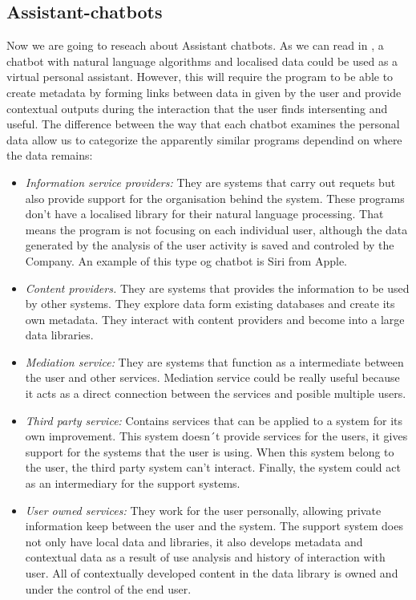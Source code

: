 \documentclass[12pt,twoside]{article}
\theoremstyle{plain}
\theoremstyle{definition}
\theoremstyle{remark}
\begin{document}
		

	\subsection{Assistant-chatbots}
	\label{sec:assistant}
	
	Now we are going to reseach about Assistant chatbots. As we can read in \cite{imrie2013virtual}, a chatbot with natural language algorithms and localised data could be used as a virtual personal assistant. However, this will require the program to be able to create metadata by forming links between data in given by the user and provide contextual outputs during the interaction that the user finds intersenting and useful. The difference between the way that each chatbot examines the personal data allow us to categorize the apparently similar programs dependind on where the data remains:
	\begin{itemize}
\item \textit{Information service providers: }
They are systems that carry out requets but also provide support for the organisation behind the system. These programs don’t have a localised library for their natural language processing. That means the program is not focusing on each individual user, although the data generated by the analysis of the user activity is saved and controled by the Company. An example of this type og chatbot is Siri from Apple.

\item \textit{Content providers.}
They are systems that provides the information to be used by other systems.  They explore data form existing databases and create its own metadata. They interact with content providers and become into a large data libraries.  

\item \textit{Mediation service:}
They are systems that function as a intermediate between the user and other services. Mediation service could be really useful because it acts as a direct connection between the services and posible multiple users.
\newpage 

\item \textit{Third party service: }
Contains services that can be applied to a system for its own improvement. This system doesn´t provide services for the users, it gives support for the systems that the user is using.  When this system belong to the user, the third party system can’t interact. Finally, the system could act as an intermediary for the support systems. 

\item \textit{User owned services: }
They work for the user personally, allowing private information keep between the user and the system. The support system does not only have local data and libraries, it also develops metadata and contextual data as a result of use analysis and history of interaction with user. All of contextually developed content in the data library is owned and under the control of the end user.
	
\end{itemize}
\end{document}
